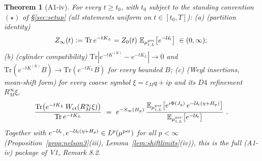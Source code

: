\documentclass[11pt,a4paper]{article}
\theoremstyle{plain}
\newtheorem{theorem}{Theorem}[section]
\theoremstyle{definition}
\newcommand{\E}{\mathbb{E}}
\newcommand{\eps}{\varepsilon}
\newcommand{\U}{\mathcal U}
\newcommand{\Trace}{\mathrm{Tr}}
\begin{document}
\begin{theorem}[A1-iv]\label{thm:A1iv}
For every $t\ge t_0$, with $t_0$ subject to the standing convention $(\star)$ of
\S\ref{sec:setup} (all statements uniform on $t\in[t_0,T]$):
\emph{(a)} (partition identity)
\[
 Z_\infty(t):=\Trace\,e^{-tK_L}
 =Z_0(t)\ \E_{\mu^{\rm per}_{t,L}}\bigl[e^{-\U_t}\bigr]\ \in(0,\infty);
\]
\emph{(b)} (cylinder compatibility) $\Trace|e^{-tK^{(K)}}-e^{-tK_L}|\to0$
and $\Trace(e^{-tK^{(K)}}B)\to\Trace(e^{-tK_L}B)$ for every bounded $B$;
\emph{(c)} (Weyl insertions, mean-shift form) for every coarse symbol
$\xi=\eps_Mq+ip$ and its $D4$ refinement $R_M^\infty\xi$,
\begin{equation}
 \frac{\Trace\bigl(e^{-tK_L}\,W_{\rm ct}(R_M^\infty\xi)\bigr)}
      {\Trace\,e^{-tK_L}}
 \ =\
 e^{-S_\infty(H_p)}\,
 \frac{\E_{\mu^{\rm per}_{t,L}}
 \bigl[e^{i\Phi(J_q)}\,e^{-\U_t(\eta+H_p)}\bigr]}
      {\E_{\mu^{\rm per}_{t,L}}\bigl[e^{-\U_t}\bigr]}\ .
 \label{eq:A2bdisplay}
\end{equation}
Together with $e^{-\U_t},e^{-\U_t(\eta+H_p)}\in L^p(\mu^{\rm per})$ for
all $p<\infty$ (Proposition~\ref{prop:nelson3}(iii),
Lemma~\ref{lem:shiftlimits}(iv)), this is the full (A1-iv) package of V1,
Remark 8.2.
\end{theorem}
\end{document}
